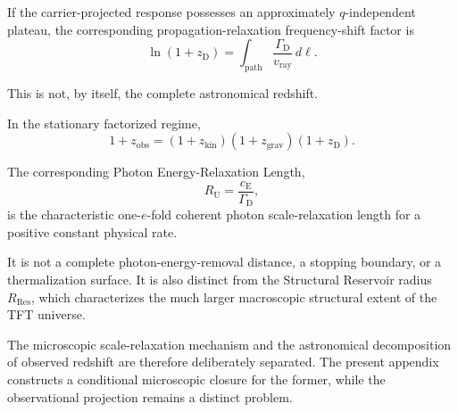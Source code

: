 If the carrier-projected response possesses an approximately
$q$-independent plateau, the corresponding propagation-relaxation
frequency-shift factor is
\begin{equation}
    \ln(1+z_{\mathrm D})
    =
    \int_{\mathrm{path}}
    \frac{
        \Gamma_{\mathrm D}
    }{
        v_{\mathrm{ray}}
    }
    \,d\ell.
\end{equation}

This is not, by itself, the complete astronomical redshift.

In the stationary factorized regime,
\begin{equation}
    1+z_{\mathrm{obs}}
    =
    (1+z_{\mathrm{kin}})
    (1+z_{\mathrm{grav}})
    (1+z_{\mathrm D}).
\end{equation}

The corresponding Photon Energy-Relaxation Length,
\begin{equation}
    R_{\mathrm U}
    =
    \frac{
        c_{\mathrm E}
    }{
        \Gamma_{\mathrm D}
    },
\end{equation}
is the characteristic one-$e$-fold coherent photon scale-relaxation length
for a positive constant physical rate.

It is not a complete photon-energy-removal distance, a stopping boundary, or a
thermalization surface. It is also distinct from the Structural Reservoir
radius $R_{\mathrm{Res}}$, which characterizes the much larger macroscopic
structural extent of the TFT universe.

The microscopic scale-relaxation mechanism and the astronomical decomposition
of observed redshift are therefore deliberately separated. The present
appendix constructs a conditional microscopic closure for the former, while
the observational projection remains a distinct problem.
